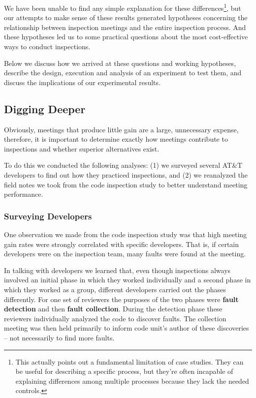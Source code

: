 We have been unable to find any simple explanation for these 
differences\footnote{This actually points out a
fundamental limitation of case studies. They can be useful for
describing a specific process, but they're often incapable of explaining
differences among multiple processes because they lack the needed controls.},  
but our attempts to make sense
of these results generated hypotheses concerning the relationship
between inspection meetings and the entire inspection process.  And these 
hypotheses led us to some practical questions about the most cost-effective 
ways to conduct inspections.

Below we  discuss how we arrived at 
these questions and working hypotheses, describe the design, 
execution and analysis of an experiment to test them, and 
discuss the implications of our experimental results.

\subsection{Digging Deeper}

Obviously, meetings that produce little gain are a large, unnecessary expense, 
therefore, it is important to determine exactly how meetings contribute 
to inspections and whether superior alternatives exist.

To do this we conducted the following analyses: (1) we surveyed several AT\&T 
developers to find out how they practiced inspections, and (2) we reanalyzed 
the field notes we took from the code inspection study to better understand meeting
performance.

\subsubsection{Surveying Developers}

One observation we made from the code inspection study was that high meeting
gain rates were strongly correlated with specific developers. That is, if 
certain developers were on the inspection team, many faults were found 
at the meeting.
 
In talking with developers we learned that, even though inspections always involved
an initial phase in which they worked individually and a second phase in which they
worked as a group, different developers carried out the phases differently.
For one set of reviewers the purposes of the two phases were {\bf fault detection} 
and then {\bf fault collection}. During
the detection phase these reviewers individually 
analyzed the code to discover faults. The
collection meeting was then held primarily to inform
code unit's author of these discoveries 
-- not necessarily to find more faults.

